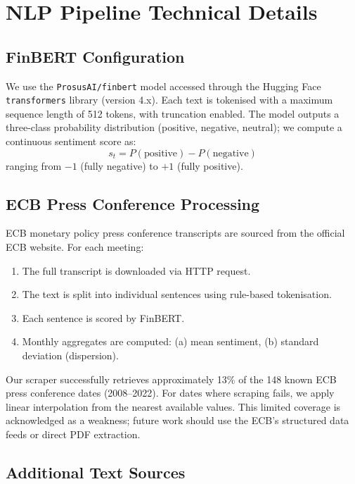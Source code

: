 \section{NLP Pipeline Technical Details}
\label{app:nlp_details}

\subsection{FinBERT Configuration}

We use the \texttt{ProsusAI/finbert} model \citep{araci2019finbert} accessed through the Hugging Face \texttt{transformers} library (version 4.x).  Each text is tokenised with a maximum sequence length of 512 tokens, with truncation enabled.  The model outputs a three-class probability distribution (positive, negative, neutral); we compute a continuous sentiment score as:
\[
  s_t = P(\text{positive}) - P(\text{negative})
\]
ranging from $-1$ (fully negative) to $+1$ (fully positive).

\subsection{ECB Press Conference Processing}

ECB monetary policy press conference transcripts are sourced from the official ECB website.  For each meeting:
\begin{enumerate}
  \item The full transcript is downloaded via HTTP request.
  \item The text is split into individual sentences using rule-based tokenisation.
  \item Each sentence is scored by FinBERT.
  \item Monthly aggregates are computed: (a) mean sentiment, (b) standard deviation (dispersion).
\end{enumerate}

Our scraper successfully retrieves approximately 13\% of the 148 known ECB press conference dates (2008--2022).  For dates where scraping fails, we apply linear interpolation from the nearest available values.  This limited coverage is acknowledged as a weakness; future work should use the ECB's structured data feeds or direct PDF extraction.

\subsection{Additional Text Sources}

